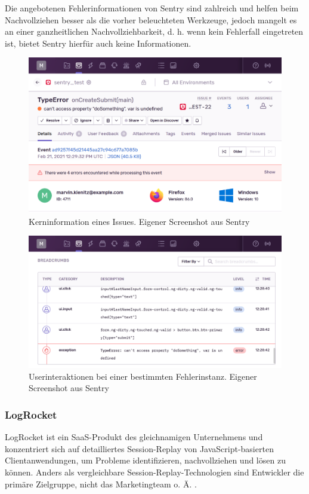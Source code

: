 Die angebotenen Fehlerinformationen von Sentry sind zahlreich und helfen beim Nachvollziehen besser als die vorher beleuchteten Werkzeuge, jedoch mangelt es an einer ganzheitlichen Nachvollziehbarkeit, d. h. wenn kein Fehlerfall eingetreten ist, bietet Sentry hierfür auch keine Informationen.

\begin{figure}[H]
	\centering
	\includegraphics[width=0.9\linewidth]{img/03_methoden/sentry_issue-details.png}
	\caption{Kerninformation eines Issues. Eigener Screenshot aus Sentry}
	\label{fig:sentry_issue-details}
\end{figure}

\begin{figure}[H]
	\centering
	\includegraphics[width=0.80\linewidth]{img/03_methoden/sentry_issue-event-breadcrumbs.png}
	\caption{Userinteraktionen bei einer bestimmten Fehlerinstanz. Eigener Screenshot aus Sentry}
	\label{fig:sentry_issue-event-breadcrumbs}
\end{figure}

\subsubsection{LogRocket}
\label{subsec:logrocket}

LogRocket \cite{LogRocket} ist ein SaaS-Produkt des gleichnamigen Unternehmens und konzentriert sich auf detailliertes Session-Replay von JavaScript-basierten Clientanwendungen, um Probleme identifizieren, nachvollziehen und lösen zu können. Anders als vergleichbare Session-Replay-Technologien sind Entwickler die primäre Zielgruppe, nicht das Marketingteam o. Ä. \cite{Webalyt}.

